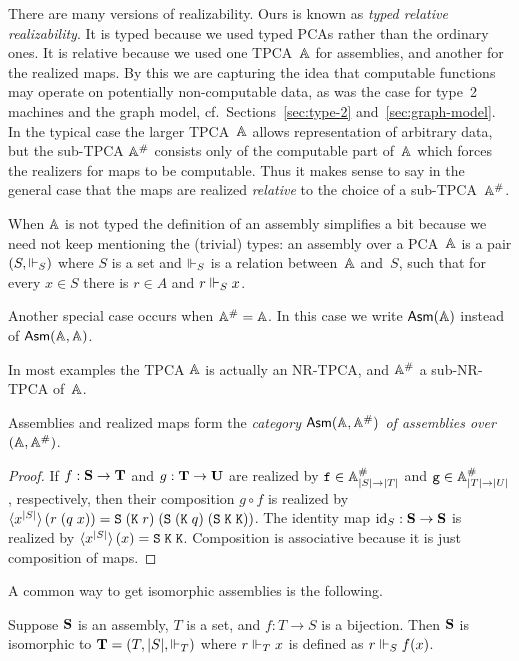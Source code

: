 There are many versions of realizability. Ours is known as \emph{typed
  relative realizability}. It is typed because we used typed PCAs
rather than the ordinary ones. It is relative because we used one
TPCA~$\AA$ for assemblies, and another for the realized maps. By this we
are capturing the idea that computable functions may operate on
potentially non-computable data, as was the case for type~2 machines
and the graph model, cf.\ Sections~\ref{sec:type-2}
and~\ref{sec:graph-model}. In the typical case the larger TPCA~$\AA$
allows representation of arbitrary data, but the sub-TPCA $\compAA$
consists only of the computable part of~$\AA$ which forces the realizers
for maps to be computable. Thus it makes sense to say in the general
case that the maps are realized \emph{relative} to the choice of a
sub-TPCA~$\compAA$.

When $\AA$ is not typed the definition of an assembly simplifies a bit
because we need not keep mentioning the (trivial) types: an assembly
over a PCA~$\AA$ is a pair $(S, {\rz_S})$ where $S$ is a set and $\rz_S$
is a relation between~$\AA$ and~$S$, such that for every $x \in S$ there
is $r \in A$ and $r \rz_S x$.

Another special case occurs when $\compAA = \AA$. In this case we write
$\Asm{\AA}$ instead of $\Asm{\AA,\AA}$.

In most examples the TPCA $\AA$ is actually an NR-TPCA, and $\compAA$ a
sub-NR-TPCA of~$\AA$.

\begin{proposition}
  Assemblies and realized maps form the \emph{category $\AsmA$ of
    assemblies over $(\AA, \compAA)$}.
\end{proposition}

\begin{proof}
  If $f : \asm{S} \to \asm{T}$ and $g : \asm{T} \to \asm{U}$ are
  realized by $\R{f} \in \compAtyp{|S| \to |T|}$ and $\R{g} \in
  \compAtyp{|T| \to |U|}$, respectively, then their composition $g
  \circ f$ is realized by $\pcalam{\annot{x}{|S|}}{r\;(q\;x)} =
  \combS\;(\combK\;r)\;(\combS\;(\combK\;q)\;(\combS\;\combK\;\combK))$.
  The identity map $\id_S : \asm{S} \to \asm{S}$ is realized by
  $\pcalam{\annot{x}{|S|}}{x} = \combS\;\combK\;\combK$. Composition
  is associative because it is just composition of maps.
\end{proof}

A common way to get isomorphic assemblies is the following.

\begin{lemma}
  \label{lemma:iso-assembly}
  Suppose $\asm{S}$ is an assembly, $T$ is a set, and $f : T \to S$ is
  a bijection. Then $\asm{S}$ is isomorphic to $\asm{T} = (T, |S|,
  {\rz_T})$ where $r \rz_T x$ is defined as $r \rz_S f(x)$.
\end{lemma}

